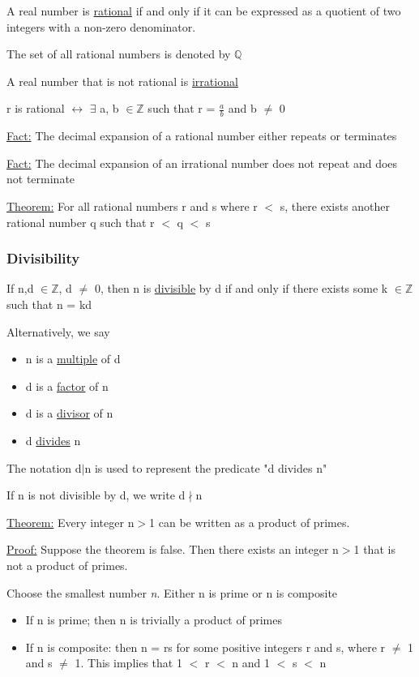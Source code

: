 \documentclass{article}
\begin{document}
A real number is \underline{rational} if and only if it can be expressed as a quotient of two integers with a non-zero denominator.

The set of all rational numbers is denoted by $\mathbb{Q}$

A real number that is not rational is \underline{irrational}

r is rational $\leftrightarrow$ $\exists$ a, b $\in \mathbb{Z}$ such that r = $\frac{a}{b}$ and b $\neq$ 0

\underline{Fact:}
The decimal expansion of a rational number either repeats or terminates

\underline{Fact:}
The decimal expansion of an irrational number does not repeat and does not terminate

\underline{Theorem:}
For all rational numbers r and s where r $<$ s, there exists another rational number q such that r $<$ q $<$ s

\subsubsection{Divisibility}

If n,d $\in \mathbb{Z}$, d $\neq$ 0, then n is \underline{divisible} by d if and only if there exists some k $\in \mathbb{Z}$ such that n = kd

Alternatively, we say
\begin{itemize}
\item n is a \underline{multiple} of d
\item d is a \underline{factor} of n
\item d is a \underline{divisor} of n
\item d \underline{divides} n
\end{itemize}

The notation d$|$n is used to represent the predicate "d divides n"

If n is not divisible by d, we write d$\nmid$n

\underline{Theorem:}
Every integer n$>$1 can be written as a product of primes.

\underline{Proof:}
Suppose the theorem is false. Then there exists an integer n$>$1 that is not a product of primes.

Choose the smallest number \textit{n}. Either n is prime or n is composite

\begin{itemize}
\item If n is prime; then n is trivially a product of primes
\item If n is composite: then n = rs for some positive integers r and s, where r $\neq$ 1 and s $\neq$ 1. This implies that 1 $<$ r $<$ n and 1 $<$ s $<$ n
\end{itemize}
\end{document}

